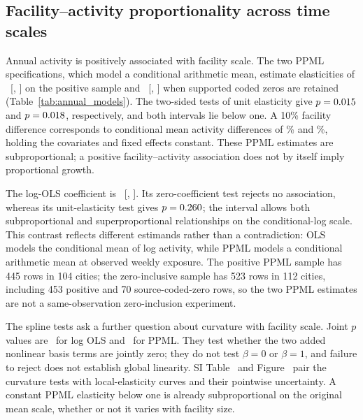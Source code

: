 \subsection{Facility--activity proportionality across time scales}
Annual activity is positively associated with facility scale. The two PPML specifications, which model a conditional arithmetic mean, estimate elasticities of \AnnualPosBeta\ [\AnnualPosLow, \AnnualPosHigh] on the positive sample and \AnnualZeroBeta\ [\AnnualZeroLow, \AnnualZeroHigh] when supported coded zeros are retained (Table~\ref{tab:annual_models}). The two-sided tests of unit elasticity give $p=0.015$ and $p=0.018$, respectively, and both intervals lie below one. A 10\% facility difference corresponds to conditional mean activity differences of \AnnualPosTen\% and \AnnualZeroTen\%, holding the covariates and fixed effects constant. These PPML estimates are subproportional; a positive facility--activity association does not by itself imply proportional growth.

The log-OLS coefficient is \AnnualOLSBeta\ [\AnnualOLSLow, \AnnualOLSHigh]. Its zero-coefficient test rejects no association, whereas its unit-elasticity test gives $p=0.260$; the interval allows both subproportional and superproportional relationships on the conditional-log scale. This contrast reflects different estimands rather than a contradiction: OLS models the conditional mean of log activity, while PPML models a conditional arithmetic mean at observed weekly exposure. The positive PPML sample has 445 rows in 104 cities; the zero-inclusive sample has 523 rows in 112 cities, including 453 positive and 70 source-coded-zero rows, so the two PPML estimates are not a same-observation zero-inclusion experiment.

The spline tests ask a further question about curvature with facility scale. Joint $p$ values are \LogSplineP\ for log OLS and \MeanSplineP\ for PPML. They test whether the two added nonlinear basis terms are jointly zero; they do not test $\beta=0$ or $\beta=1$, and failure to reject does not establish global linearity. SI Table~ and Figure~ pair the curvature tests with local-elasticity curves and their pointwise uncertainty. A constant PPML elasticity below one is already subproportional on the original mean scale, whether or not it varies with facility size.

